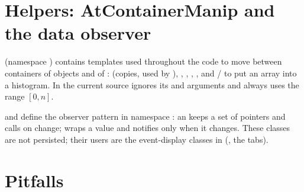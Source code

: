 \section{Helpers: AtContainerManip and the data observer}
\label{sec:dm-helpers}

 (namespace ) contains templates used throughout the
code to move between containers of objects and of :  (copies,
used by ), , ,
, , and / to put an
array into a histogram. In the current source  ignores its  and
 arguments and always uses the range $[0, n]$.

 and  define the observer pattern in namespace
: an  keeps a set of  pointers and calls
 on change;  wraps a value and notifies only when it changes. These
classes are not persisted; their users are the event-display classes in 
(, the tabs).

\section{Pitfalls}
\label{sec:dm-pitfalls}

